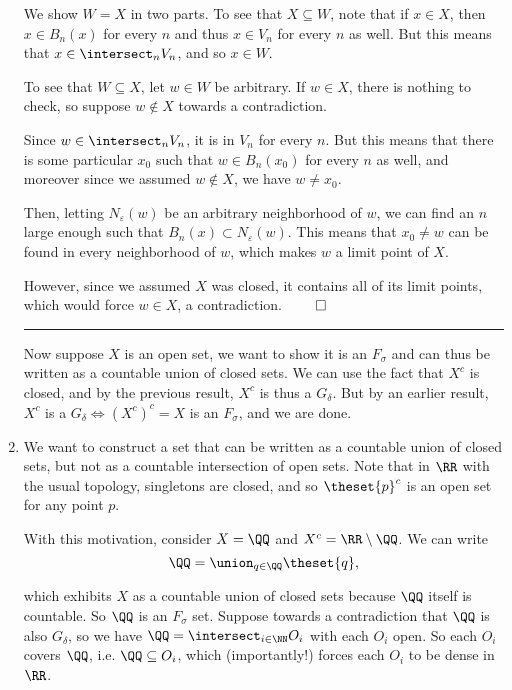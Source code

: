 \begin{solution}
\begin{enumerate}
  We show $W=X$ in two parts. To see that $X \subseteq W$, note that if $x\in X$, then $x \in B_n(x)$ for every $n$ and thus $x \in V_n$ for every $n$ as well. But this means that $x \in \intersect_n V_n$, and so $x\in W$.

  To see that $W \subseteq X$, let $w\in W$ be arbitrary. If $w\in X$, there is nothing to check, so suppose $w\not\in X$ towards a contradiction.

  Since $w \in \intersect_n V_n$, it is in $V_n$ for every $n$. But this means that there is some particular $x_0$ such that $w \in B_n(x_0)$ for every $n$ as well, and moreover since we assumed $w\not\in X$, we have $w\neq x_0$.

  Then, letting $N_\varepsilon(w)$ be an arbitrary neighborhood of $w$, we can find an $n$ large enough such that $B_n(x) \subset N_\varepsilon(w)$. This means that $x_0 \neq w$ can be found in every neighborhood of $w$, which makes $w$ a limit point of $X$.

  However, since we assumed $X$ was closed, it contains all of its limit points, which would force $w \in X$, a contradiction. $\qed$

  \vspace{1em}\hrule

  Now suppose $X$ is an open set, we want to show it is an $F_\sigma$ and can thus be written as a countable union of closed sets. We can use the fact that $X^c$ is closed, and by the previous result, $X^c$ is thus a $G_\delta$. But by an earlier result, $X^c$ is a $G_\delta \iff (X^c)^c = X$ is an $F_\sigma$, and we are done.

  \item We want to construct a set that can be written as a countable union of closed sets, but not as a countable intersection of open sets. Note that in $\RR$ with the usual topology, singletons are closed, and so $\theset{p}^c$ is an open set for any point $p$.

  With this motivation, consider $X = \QQ$ and $X^c = \RR \setminus \QQ$. We can write
  $$
  \QQ = \union_{q \in \QQ} \theset{q},
  $$

  which exhibits $X$ as a countable union of closed sets because $\QQ$ itself is countable. So $\QQ$ is an $F_\sigma$ set. Suppose towards a contradiction that $\QQ$ is also $G_\delta$, so we have $\QQ = \intersect_{i\in\NN}O_i$ with each $O_i$ open. So each $O_{i}$ covers $\QQ$, i.e. $\QQ \subseteq O_{i}$, which (importantly!) forces each $O_i$ to be dense in $\RR$.


\end{enumerate}
\end{solution}
